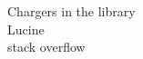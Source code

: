 \documentclass[preview]{standalone}
\begin{document}
Chargers in the library\\Lucine\\stack overflow\\
\end{document}
